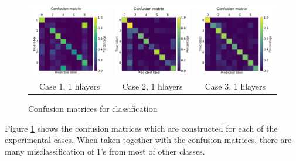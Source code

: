 \documentclass[sigconf]{acmart}
\begin{document}
\begin{figure}[tbh]
    \centering
    \begin{centering}
    \begin{tabular}{ccc}
        \includegraphics[width=0.30\linewidth, trim=0cm 0cm 0cm 1.5cm, clip=true]{mnist_confusion_matrix_rate_based_case_1_rate_pynn8_1dlayers_3x_20200217}&
        \includegraphics[width=0.30\linewidth, trim=0cm 0cm 0cm 1.5cm, clip=true]{mnist_confusion_matrix_rate_based_case_2_rate_pynn8_1dlayers_3x_20200217}&
        \includegraphics[width=0.30\linewidth, trim=0cm 0cm 0cm 1.5cm, clip=true]{mnist_confusion_matrix_rate_based_case_3_rate_pynn8_1dlayers_2x_20200217}\\
        Case 1, 1 hlayers & Case 2, 1 hlayers & Case 3, 1 hlayers
        \end{tabular}
     \end{centering}
     \caption{Confusion matrices for classification}
     \label{fig:confmat}
    \vspace{-10pt}
\end{figure}

Figure \ref{fig:confmat} shows the confusion matrices which are constructed for each of the experimental cases.
When taken together with the confusion matrices, there are many misclassification of 1's from most of other classes.

\end{document}

